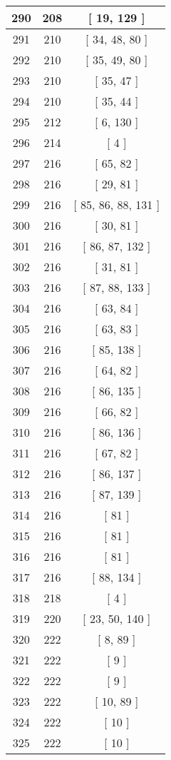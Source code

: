 \begin{center}
\begin{longtable}[H]{|| c c c ||}
\hline
290 & 208 & [ 19, 129 ] \\ 
\hline
291 & 210 & [ 34, 48, 80 ] \\ 
\hline
292 & 210 & [ 35, 49, 80 ] \\ 
\hline
293 & 210 & [ 35, 47 ] \\ 
\hline
294 & 210 & [ 35, 44 ] \\ 
\hline
295 & 212 & [ 6, 130 ] \\ 
\hline
296 & 214 & [ 4 ] \\ 
\hline
297 & 216 & [ 65, 82 ] \\ 
\hline
298 & 216 & [ 29, 81 ] \\ 
\hline
299 & 216 & [ 85, 86, 88, 131 ] \\ 
\hline
300 & 216 & [ 30, 81 ] \\ 
\hline
301 & 216 & [ 86, 87, 132 ] \\ 
\hline
302 & 216 & [ 31, 81 ] \\ 
\hline
303 & 216 & [ 87, 88, 133 ] \\ 
\hline
304 & 216 & [ 63, 84 ] \\ 
\hline
305 & 216 & [ 63, 83 ] \\ 
\hline
306 & 216 & [ 85, 138 ] \\ 
\hline
307 & 216 & [ 64, 82 ] \\ 
\hline
308 & 216 & [ 86, 135 ] \\ 
\hline
309 & 216 & [ 66, 82 ] \\ 
\hline
310 & 216 & [ 86, 136 ] \\ 
\hline
311 & 216 & [ 67, 82 ] \\ 
\hline
312 & 216 & [ 86, 137 ] \\ 
\hline
313 & 216 & [ 87, 139 ] \\ 
\hline
314 & 216 & [ 81 ] \\ 
\hline
315 & 216 & [ 81 ] \\ 
\hline
316 & 216 & [ 81 ] \\ 
\hline
317 & 216 & [ 88, 134 ] \\ 
\hline
318 & 218 & [ 4 ] \\ 
\hline
319 & 220 & [ 23, 50, 140 ] \\ 
\hline
320 & 222 & [ 8, 89 ] \\ 
\hline
321 & 222 & [ 9 ] \\ 
\hline
322 & 222 & [ 9 ] \\ 
\hline
323 & 222 & [ 10, 89 ] \\ 
\hline
324 & 222 & [ 10 ] \\ 
\hline
325 & 222 & [ 10 ] \\ 

\end{longtable}
\end{center}
